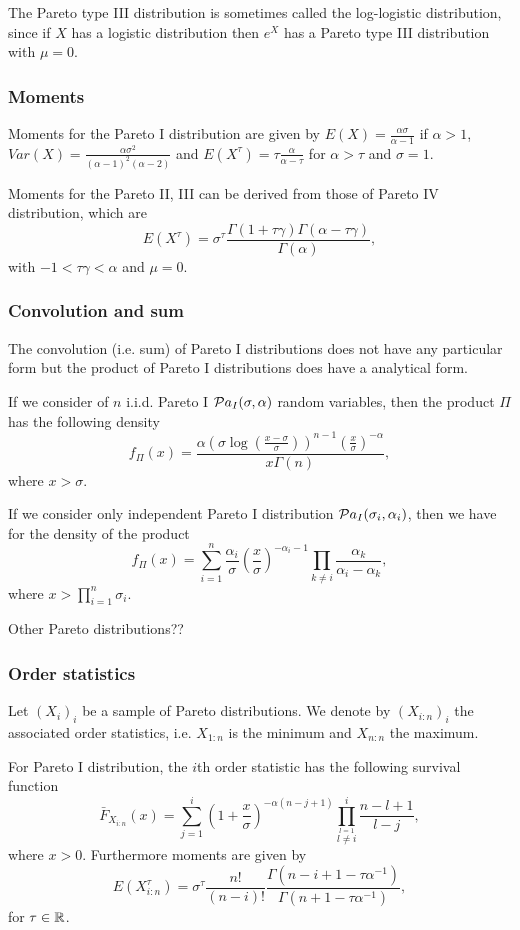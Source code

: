 The Pareto type III distribution is sometimes called the log-logistic distribution, since if $X$ has a logistic distribution then $e^X$ has a Pareto type III distribution with $\mu=0$.

\subsubsection{Moments}
Moments for the Pareto I distribution are given by 
$E(X) = \frac{\alpha \sigma}{\alpha-1}$ if $\alpha > 1$, $Var(X) = \frac{\alpha \sigma^2}{(\alpha-1)^2(\alpha-2)}$ and $E(X^\tau) = \tau \frac{\alpha}{\alpha-\tau}$ for $\alpha >\tau$ and $\sigma=1$.

Moments for the Pareto II, III can be derived from those of Pareto IV distribution, which are
$$
E(X^\tau) = \sigma^\tau \frac{\Gamma(1+\tau\gamma)\Gamma(\alpha-\tau\gamma)}{\Gamma(\alpha)},
$$
with $-1<\tau\gamma<\alpha$ and $\mu=0$.

\subsubsection{Convolution and sum}
The convolution (i.e. sum) of Pareto I distributions does not have any particular form but the product of Pareto I distributions does have a analytical form. 

If we consider of $n$ i.i.d. Pareto I $\mathcal Pa_I(\sigma, \alpha)$ random variables, then the product $\Pi$ has the following density
$$
f_\Pi(x) = \frac{\alpha \left(\sigma \log(\frac{x-\sigma}{\sigma}) \right)^{n-1} \left(\frac{x}{\sigma}\right)^{-\alpha}  }{x \Gamma(n)},
$$
where $x>\sigma$.

If we consider only independent Pareto I distribution $\mathcal Pa_I(\sigma_i, \alpha_i)$, then we have for the density of the product
$$
f_\Pi(x) = \sum_{i=1}^n\frac{\alpha_i}{\sigma} \left(\frac{x}{\sigma}\right)^{-\alpha_i-1} \prod_{k\neq i}\frac{\alpha_k}{\alpha_i-\alpha_k},
$$
where $x> \prod_{i=1}^n\sigma_i$.

Other Pareto distributions??



\subsubsection{Order statistics}
Let $(X_i)_i$ be a sample of Pareto distributions. We denote by $(X_{i:n})_i$ the associated order statistics, i.e. $X_{1:n}$ is the minimum and $X_{n:n}$ the maximum.

For Pareto I distribution, the $i$th order statistic has the following survival function
$$
\bar F_{X_{i:n}}(x) = \sum_{j=1}^i \left(1+\frac{x}{\sigma}\right)^{-\alpha(n-j+1)} \prod_{\stackrel{l=1}{l\neq i}}^{i}\frac{n-l+1}{l-j},
$$
where $x>0$. Furthermore moments are given by
$$
E(X_{i:n}^\tau) = \sigma^\tau \frac{n!}{(n-i)!} \frac{\Gamma(n-i+1-\tau\alpha^{-1})}{\Gamma(n+1-\tau\alpha^{-1})},
$$
for $\tau\in\mathbb R$.

